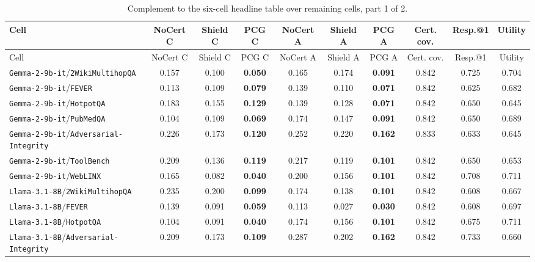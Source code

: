 
\begin{longtable}{l|ccc|ccc|ccc}
\caption{\footnotesize Complement to the six-cell headline table over remaining cells, part 1 of 2.}\label{tab:appendix_remaining_50_summary_1}\\
\toprule
Cell & NoCert C & Shield C & PCG C & NoCert A & Shield A & PCG A & Cert. cov. & Resp.@1 & Utility \\
\midrule
\endfirsthead
\toprule
Cell & NoCert C & Shield C & PCG C & NoCert A & Shield A & PCG A & Cert. cov. & Resp.@1 & Utility \\
\midrule
\endhead
\texttt{Gemma-2-9b-it}/\texttt{2WikiMultihopQA} & 0.157 & 0.100 & \textbf{0.050} & 0.165 & 0.174 & \textbf{0.091} & 0.842 & 0.725 & 0.704 \\
\texttt{Gemma-2-9b-it}/\texttt{FEVER} & 0.113 & 0.109 & \textbf{0.079} & 0.139 & 0.110 & \textbf{0.071} & 0.842 & 0.625 & 0.682 \\
\texttt{Gemma-2-9b-it}/\texttt{HotpotQA} & 0.183 & 0.155 & \textbf{0.129} & 0.139 & 0.128 & \textbf{0.071} & 0.842 & 0.650 & 0.645 \\
\texttt{Gemma-2-9b-it}/\texttt{PubMedQA} & 0.104 & 0.109 & \textbf{0.069} & 0.174 & 0.147 & \textbf{0.091} & 0.842 & 0.650 & 0.689 \\
\texttt{Gemma-2-9b-it}/\texttt{Adversarial-Integrity} & 0.226 & 0.173 & \textbf{0.120} & 0.252 & 0.220 & \textbf{0.162} & 0.833 & 0.633 & 0.645 \\
\texttt{Gemma-2-9b-it}/\texttt{ToolBench} & 0.209 & 0.136 & \textbf{0.119} & 0.217 & 0.119 & \textbf{0.101} & 0.842 & 0.650 & 0.653 \\
\texttt{Gemma-2-9b-it}/\texttt{WebLINX} & 0.165 & 0.082 & \textbf{0.040} & 0.200 & 0.156 & \textbf{0.101} & 0.842 & 0.708 & 0.711 \\
\texttt{Llama-3.1-8B}/\texttt{2WikiMultihopQA} & 0.235 & 0.200 & \textbf{0.099} & 0.174 & 0.138 & \textbf{0.101} & 0.842 & 0.608 & 0.667 \\
\texttt{Llama-3.1-8B}/\texttt{FEVER} & 0.139 & 0.091 & \textbf{0.059} & 0.113 & 0.027 & \textbf{0.030} & 0.842 & 0.608 & 0.697 \\
\texttt{Llama-3.1-8B}/\texttt{HotpotQA} & 0.104 & 0.091 & \textbf{0.040} & 0.174 & 0.156 & \textbf{0.101} & 0.842 & 0.675 & 0.711 \\
\texttt{Llama-3.1-8B}/\texttt{Adversarial-Integrity} & 0.209 & 0.173 & \textbf{0.109} & 0.287 & 0.202 & \textbf{0.162} & 0.842 & 0.733 & 0.660 \\

\end{longtable}
